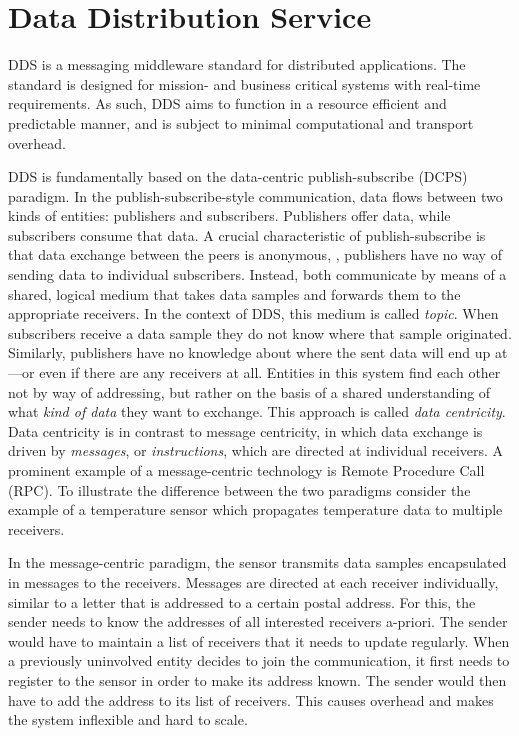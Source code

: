 \section{Data Distribution Service}

DDS is a messaging middleware standard \cite{dds-1.4-standard} for distributed applications. The standard is designed for mission- and business critical systems with real-time requirements. As such, DDS aims to function in a resource efficient and predictable manner, and is subject to minimal computational and transport overhead.

DDS is fundamentally based on the data-centric publish-subscribe (DCPS) paradigm. In the publish-subscribe-style communication, data flows between two kinds of entities: publishers and subscribers. Publishers offer data, while subscribers consume that data. A crucial characteristic of publish-subscribe is that data exchange between the peers is anonymous, \ie , publishers have no way of sending data to individual subscribers. Instead, both communicate by means of a shared, logical medium that takes data samples and forwards them to the appropriate receivers. In the context of DDS, this medium is called \emph{topic}. When subscribers receive a data sample they do not know where that sample originated. Similarly, publishers have no knowledge about where the sent data will end up at---or even if there are any receivers at all. Entities in this system find each other not by way of addressing, but rather on the basis of a shared understanding of what \emph{kind of data} they want to exchange. This approach is called \emph{data centricity}. Data centricity is in contrast to message centricity, in which data exchange is driven by \emph{messages}, or \emph{instructions}, which are directed at individual receivers. A prominent example of a message-centric technology is Remote Procedure Call (RPC). To illustrate the difference between the two paradigms consider  the example of a temperature sensor which propagates temperature data to multiple receivers. 

In the message-centric paradigm, the sensor transmits data samples encapsulated in messages to the receivers. Messages are directed at each receiver individually, similar to a letter that is addressed to a certain postal address. For this, the sender needs to know the addresses of all interested receivers a-priori. The sender would have to maintain a list of receivers that it needs to update regularly. When a previously uninvolved entity decides to join the communication, it first needs to register to the sensor in order to make its address known. The sender would then have to add the address to its list of receivers. This causes overhead and makes the system inflexible and hard to scale.

